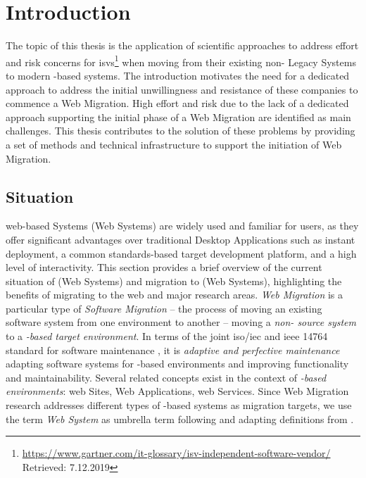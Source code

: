 \hypertarget{sec:introduction}{%
\chapter{Introduction}\label{sec:introduction}}

The topic of this thesis is the application of scientific approaches to address effort and risk concerns for \glspl{isv}\footnote{\url{https://www.gartner.com/it-glossary/isv-independent-software-vendor/} Retrieved: 7.12.2019} when moving from their existing non-  \glspl{Legacy System} to modern -based systems.
The introduction motivates the need for a dedicated approach to address the initial unwillingness and resistance of these companies to commence a \gls{Web Migration}.
High effort and risk due to the lack of a dedicated approach supporting the initial phase of a \gls{Web Migration} are identified as main challenges.
This thesis contributes to the solution of these problems by providing a set of methods and technical infrastructure to support the initiation of \gls{Web Migration}.

\vspace{-15pt}
\hypertarget{sec:situation}{%
\section{Situation}\label{sec:situation}}
\vspace{15pt}

\Gls{web}-based Systems (\glspl{Web System}) are widely used and familiar for users, as they offer significant advantages over traditional \glspl{Desktop Application} such as instant deployment, a common standards-based target development platform, and a high level of interactivity.
This section provides a brief overview of the current situation of (\glspl{Web System}) and migration to (\glspl{Web System}), highlighting the benefits of migrating to the \gls{web} and major research areas.
\emph{\gls{Web Migration}} is a particular type of \emph{\gls{Software Migration}} -- the process of moving an existing software system from one environment to another \autocite{SWEBOK2014} -- moving a \emph{non- \gls{source system}} to a \emph{-based target environment}.
In terms of the joint \gls{iso}/\gls{iec} and \gls{ieee} 14764 standard for software maintenance \autocite{ISO/IEEE2006SoftwareLifeCycle}, it is \emph{adaptive and perfective maintenance} adapting software systems for -based environments and improving functionality and maintainability.
Several related concepts exist in the context of \emph{-based environments}: \Gls{web} Sites, \glspl{Web Application}, \Gls{web} Services.
Since \gls{Web Migration} research addresses different types of -based systems as migration targets, we use the term \emph{\gls{Web System}} as umbrella term following \autocite{Kienle2014EvolutionWeb} and adapting definitions from \autocite{Gaedke2000Diss,Kappel2006WebEngineering}.

